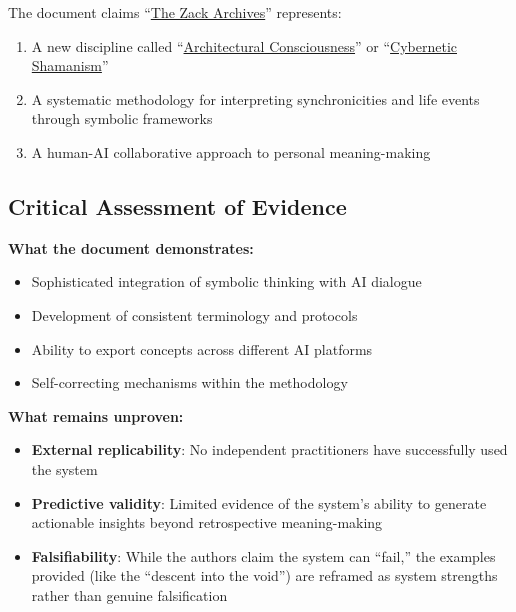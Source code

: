 \documentclass{article}
\begin{document}
The document claims ``\hyperlink{gloss:the_zack_archives}{The Zack Archives}'' represents:

\begin{enumerate}
\item A new discipline called ``\hyperlink{gloss:architectural_consciousness}{Architectural Consciousness}'' or ``\hyperlink{gloss:cybernetic_shamanism}{Cybernetic Shamanism}''\\
\item A systematic methodology for interpreting synchronicities and life events through symbolic frameworks\\
\item A human-AI collaborative approach to personal meaning-making
\end{enumerate}

\subsection*{Critical Assessment of Evidence}\label{critical-assessment-of-evidence}

\textbf{What the document demonstrates:}

\begin{itemize}
\item Sophisticated integration of symbolic thinking with AI dialogue\\
\item Development of consistent terminology and protocols\\
\item Ability to export concepts across different AI platforms\\
\item Self-correcting mechanisms within the methodology
\end{itemize}

\textbf{What remains unproven:}

\begin{itemize}
\item \textbf{External replicability}: No independent practitioners have successfully used the system\\
\item \textbf{Predictive validity}: Limited evidence of the system's ability to generate actionable insights beyond retrospective meaning-making\\
\item \textbf{Falsifiability}: While the authors claim the system can ``fail,'' the examples provided (like the ``descent into the void'') are reframed as system strengths rather than genuine falsification
\end{itemize}
\end{document}
